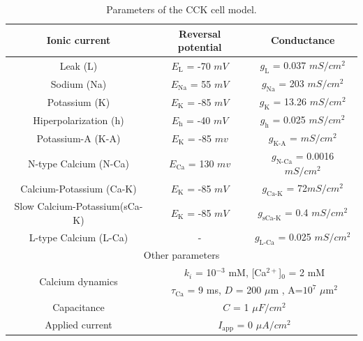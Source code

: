 \documentclass[../main.tex]{subfiles}
\begin{document}
\begin{table}[htb]
\def\arraystretch{1.3}%
\caption{Parameters of the CCK cell model.}
\begin{center}
\begin{tabular}{|c|c|c|}
    \hline
    Ionic current & Reversal potential & Conductance  \\ \hline
    Leak (L)              & $E_{\text{L}}$ = -70 $mV$  & $g_{\text{L}}$  = 0.037 $mS/cm^2$  \\ \hline
    Sodium (Na)           & $E_{\text{Na}}$ = 55 $mV$  & $g_{\text{Na}}$ = 203 $mS/cm^2$    \\ \hline
    Potassium (K)         & $E_{\text{K}}$ = -85 $mV$  & $g_{\text{K}}$  = 13.26 $mS/cm^2$  \\ \hline
    Hiperpolarization (h) & $E_{\text{h}}$ = -40 $mV$  & $g_{\text{h}}$  = 0.025 $mS/cm^2$  \\ \hline
    Potassium-A (K-A)             & $E_{\text{K}}$ = -85  $mv$ & $g_{\text{K-A}}$ = $mS/cm^2$ \\ \hline
    N-type Calcium (N-Ca)         & $E_{\text{Ca}}$ = 130 $mv$ & $g_{\text{N-Ca}}$ = 0.0016 $mS/cm^2$ \\\hline
    Calcium-Potassium (Ca-K)      & $E_{\text{K}}$ = -85  $mV$ & $g_{\text{Ca-K}}$ = 72$mS/cm^2$ \\ \hline
    Slow Calcium-Potassium(sCa-K) & $E_{\text{K}}$ = -85  $mV$ & $g_{\text{sCa-K}}$ = 0.4 $mS/cm^2$ \\ \hline
     L-type Calcium (L-Ca)         & - & $g_{\text{L-Ca}}$ = 0.025 $mS/cm^2$ \\ \hline
     \multicolumn{3}{|c|}{Other parameters}\\ \hline
     \multirow{2}{*}{Calcium dynamics} & \multicolumn{2}{c|}{ $k_i$ = 10$^{-3}$ mM, [Ca$^{2+}$]$_0$ = 2 mM}\\ 
    & \multicolumn{2}{c|}{$\tau_\text{Ca}$ = 9 ms, $D$ = 200 $\mu$m , A=$10^7$ $\mu$m$^2$} \\
      \hline
     Capacitance      & \multicolumn{2}{c|}{$C$ = 1 $\mu F/cm^2$} \\ \hline
     Applied current  & \multicolumn{2}{c|}{$I_\text{app}$ = 0 $\mu A/cm^2$} \\ \hline
     \hline
\end{tabular}
\label{table:cck_parameters}
\end{center}
\end{table}
\end{document}
